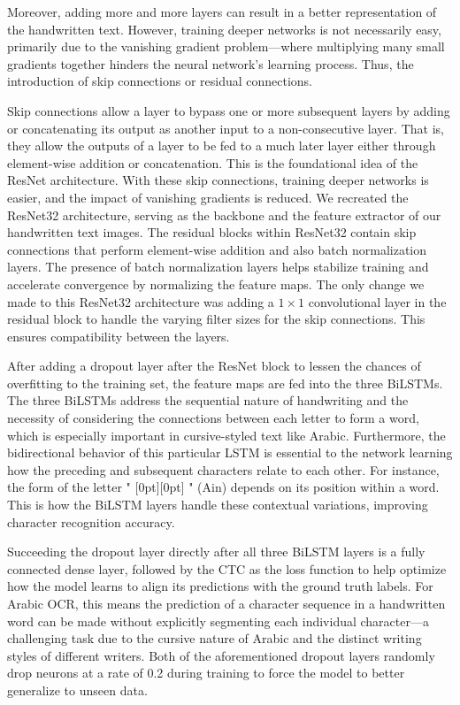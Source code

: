\documentclass[conference]{IEEEtran}
\newcommand{\artext}[1]{%
  {\fontsize{8pt}{11pt}\selectfont \raisebox{0pt}[0pt][0pt]{\RL{#1}}}%
}
\begin{document}
Moreover, adding more and more layers can result in a better representation of the handwritten text. However, training deeper networks is not necessarily easy, primarily due to the vanishing gradient problem---where multiplying many small gradients together hinders the neural network's learning process. Thus, the introduction of skip connections or residual connections.

Skip connections allow a layer to bypass one or more subsequent layers by adding or concatenating its output as another input to a non-consecutive layer. That is, they allow the outputs of a layer to be fed to a much later layer either through element-wise addition or concatenation. This is the foundational idea of the ResNet architecture. With these skip connections, training deeper networks is easier, and the impact of vanishing gradients is reduced. We recreated the ResNet32 architecture, serving as the backbone and the feature extractor of our handwritten text images. The residual blocks within ResNet32 contain skip connections that perform element-wise addition and also batch normalization layers. The presence of batch normalization layers helps stabilize training and accelerate convergence by normalizing the feature maps. The only change we made to this ResNet32 architecture was adding a \( 1 \times 1 \) convolutional layer in the residual block to handle the varying filter sizes for the skip connections. This ensures compatibility between the layers.

After adding a dropout layer after the ResNet block to lessen the chances of overfitting to the training set, the feature maps are fed into the three BiLSTMs. The three BiLSTMs address the sequential nature of handwriting and the necessity of considering the connections between each letter to form a word, which is especially important in cursive-styled text like Arabic. Furthermore, the bidirectional behavior of this particular LSTM is essential to the network learning how the preceding and subsequent characters relate to each other. For instance, the form of the letter "\artext{ع}" (Ain) depends on its position within a word. This is how the BiLSTM layers handle these contextual variations, improving character recognition accuracy.

Succeeding the dropout layer directly after all three BiLSTM layers is a fully connected dense layer, followed by the CTC as the loss function to help optimize how the model learns to align its predictions with the ground truth labels. For Arabic OCR, this means the prediction of a character sequence in a handwritten word can be made without explicitly segmenting each individual character---a challenging task due to the cursive nature of Arabic and the distinct writing styles of different writers. Both of the aforementioned dropout layers randomly drop neurons at a rate of 0.2 during training to force the model to better generalize to unseen data.
\end{document}
